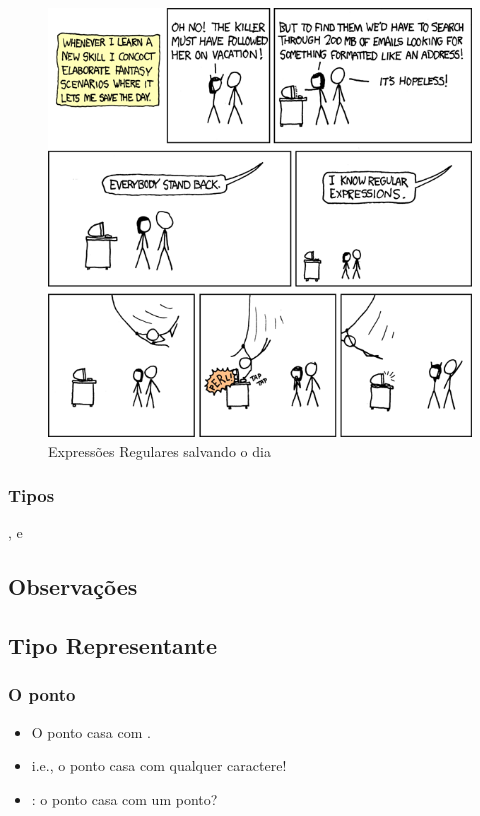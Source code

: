 \begin{frame}
	\begin{figure}
		\centering
			\includegraphics[height=0.8\textheight]{imagens/re/regular_expressions.png}
		\caption{Expressões Regulares salvando o dia}
	\end{figure}

\end{frame}

\begin{frame}
	\frametitle{Tipos}
	\Large{,  e }
\end{frame}

\subsection{Observações}

\subsection{Tipo Representante}


\begin{frame}
	\frametitle{O ponto}
	\begin{itemize}
		\item \Large{O ponto casa com .}
		\item i.e., o ponto casa com qualquer caractere!
		\item {}: o ponto casa com um ponto?
	\end{itemize}
\end{frame}

